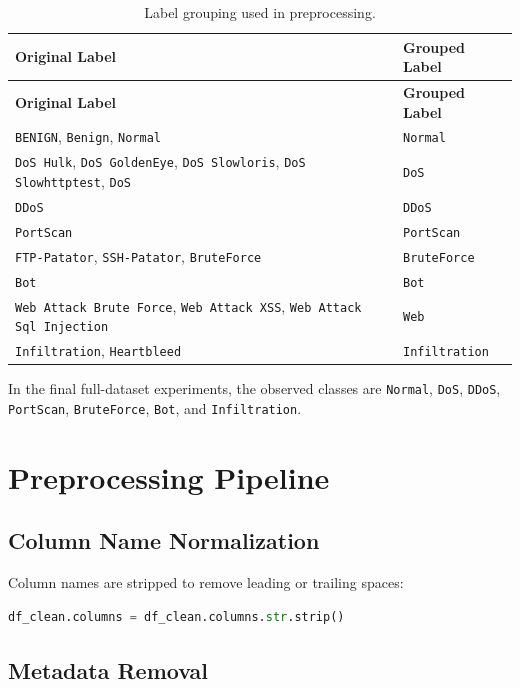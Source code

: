 \documentclass[12pt,a4paper]{article}
\begin{document}
\begin{longtable}{p{} p{}}
\caption{Label grouping used in preprocessing.}\\
\toprule
\textbf{Original Label} & \textbf{Grouped Label} \\
\midrule
\endfirsthead
\toprule
\textbf{Original Label} & \textbf{Grouped Label} \\
\midrule
\endhead
\texttt{BENIGN}, \texttt{Benign}, \texttt{Normal} & \texttt{Normal} \\
\texttt{DoS Hulk}, \texttt{DoS GoldenEye}, \texttt{DoS Slowloris}, \texttt{DoS Slowhttptest}, \texttt{DoS} & \texttt{DoS} \\
\texttt{DDoS} & \texttt{DDoS} \\
\texttt{PortScan} & \texttt{PortScan} \\
\texttt{FTP-Patator}, \texttt{SSH-Patator}, \texttt{BruteForce} & \texttt{BruteForce} \\
\texttt{Bot} & \texttt{Bot} \\
\texttt{Web Attack Brute Force}, \texttt{Web Attack XSS}, \texttt{Web Attack Sql Injection} & \texttt{Web} \\
\texttt{Infiltration}, \texttt{Heartbleed} & \texttt{Infiltration} \\
\bottomrule
\end{longtable}

In the final full-dataset experiments, the observed classes are \texttt{Normal}, \texttt{DoS}, \texttt{DDoS}, \texttt{PortScan}, \texttt{BruteForce}, \texttt{Bot}, and \texttt{Infiltration}.

\section{Preprocessing Pipeline}

\subsection{Column Name Normalization}

Column names are stripped to remove leading or trailing spaces:

\begin{lstlisting}[language=Python]
df_clean.columns = df_clean.columns.str.strip()
\end{lstlisting}

\subsection{Metadata Removal}
\end{document}
